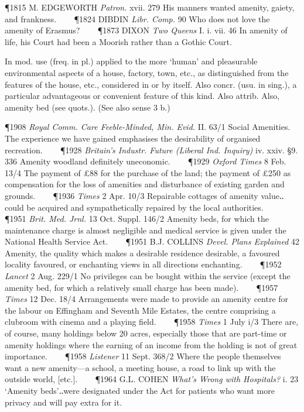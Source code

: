 \begin{description}[wide, labelwidth=!, labelindent=0pt]
\begin{myenumerate}
\P 1815 M. EDGEWORTH \textit{Patron.} xvii. 279 His manners wanted amenity, gaiety, and frankness.    
\P 1824 DIBDIN \textit{Libr. Comp.} 90 Who does not love the amenity of Erasmus?    
\P 1873 DIXON \textit{Two Queens} I. i. vii. 46 In amenity of life, his Court had been a Moorish rather than a Gothic Court.

 In mod. use (freq. in pl.) applied to the more ‘human’ and pleasurable environmental aspects of a house, factory, town, etc., as distinguished from the features of the house, etc., considered in or by itself. Also concr. (usu. in sing.), a particular advantageous or convenient feature of this kind. Also attrib. Also, amenity bed (see quots.). (See also sense 3 b.) 

\P 1908 \textit{Royal Comm. Care Feeble-Minded, Min. Evid.} II. 63/1 Social Amenities. The experience we have gained emphasises the desirability of organised recreation.    
\P 1928 \textit{Britain's Industr. Future (Liberal Ind. Inquiry)} iv. xxiv. §9. 336 Amenity woodland definitely uneconomic.    
\P 1929 \textit{Oxford Times} 8 Feb. 13/4 The payment of £88 for the purchase of the land; the payment of £250 as compensation for the loss of amenities and disturbance of existing garden and grounds.    
\P 1936 \textit{Times} 2 Apr. 10/3 Repairable cottages of amenity value‥could be acquired and sympathetically repaired by the local authorities.    
\P 1951 \textit{Brit. Med. Jrnl.} 13 Oct. Suppl. 146/2 Amenity beds, for which the maintenance charge is almost negligible and medical service is given under the National Health Service Act.    
\P 1951 B.J. COLLINS \textit{Devel. Plans Explained} 42 Amenity, the quality which makes a desirable residence desirable, a favoured locality favoured, or enchanting views in all directions enchanting.    
\P 1952 \textit{Lancet} 2 Aug. 229/1 No privileges can be bought within the service (except the amenity bed, for which a relatively small charge has been made).    
\P 1957 \textit{Times} 12 Dec. 18/4 Arrangements were made to provide an amenity centre for the labour on Effingham and Seventh Mile Estates, the centre comprising a clubroom with cinema and a playing field.    
\P 1958 \textit{Times} 1 July i/3 There are, of course, many holdings below 20 acres, especially those that are part-time or amenity holdings where the earning of an income from the holding is not of great importance.    
\P 1958 \textit{Listener} 11 Sept. 368/2 Where the people themselves want a new amenity—a school, a meeting house, a road to link up with the outside world, [etc.].    
\P 1964 G.L. COHEN \textit{What's Wrong with Hospitals?} i. 23 ‘Amenity beds’‥were designated under the Act for patients who want more privacy and will pay extra for it.


\end{myenumerate}
\end{description}
